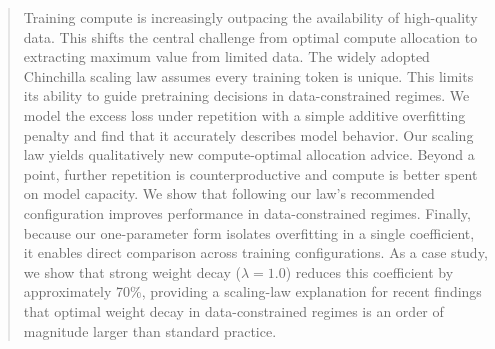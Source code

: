 \begin{abstract}
Training compute is increasingly outpacing the availability of high-quality data. This shifts the central challenge from optimal compute allocation to extracting maximum value from limited data. The widely adopted Chinchilla scaling law assumes every training token is unique. This limits its ability to guide pretraining decisions in data-constrained regimes. We model the excess loss under repetition with a simple additive overfitting penalty and find that it accurately describes model behavior. Our scaling law yields qualitatively new compute-optimal allocation advice. Beyond a point, further repetition is counterproductive and compute is better spent on model capacity. We show that following our law's recommended configuration improves performance in data-constrained regimes. Finally, because our one-parameter form isolates overfitting in a single coefficient, it enables direct comparison across training configurations. As a case study, we show that strong weight decay ($\lambda=1.0$) reduces this coefficient by approximately 70\%, providing a scaling-law explanation for recent findings that optimal weight decay in data-constrained regimes is an order of magnitude larger than standard practice.

\end{abstract}
